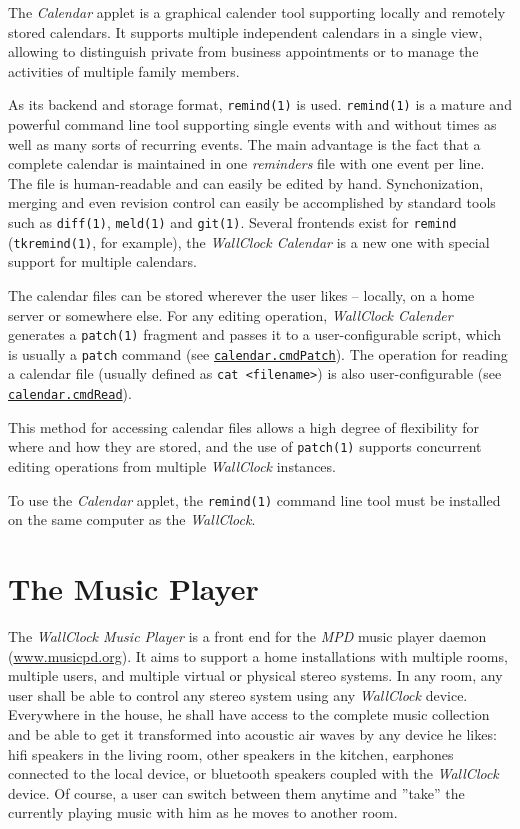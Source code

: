\documentclass[12pt,english,parskip=half]{scrreprt}
\newcommand{\idx}[1]{#1\index{#1}}
\newcommand{\envref}[1]{\hyperref[env:#1]{\texttt{#1}}}        %
\begin{document}
The \emph{Calendar} applet is a graphical calender tool supporting
locally and remotely stored calendars. It supports multiple independent
calendars in a single view, allowing to distinguish private from
business appointments or to manage the activities of multiple family
members.

As its backend and storage format, \texttt{remind(1)} is used.
\texttt{remind(1)} is a mature and powerful command line tool
supporting single events with and without times as well as
many sorts of recurring events. The main advantage is the fact that a
complete calendar is maintained in one \emph{reminders} file with one
event per line. The file is human-readable and can easily be
edited by hand. Synchonization, merging and even
revision control can easily be accomplished by standard tools such as
\texttt{diff(1)}, \texttt{meld(1)} and \texttt{git(1)}. 
Several frontends exist for \texttt{remind} (\texttt{tkremind(1)}, for example),
the \emph{WallClock Calendar} is a new one with special support for multiple
calendars.

The calendar files can be stored wherever the user likes -- locally, on
a home server or somewhere else. 
For any editing operation, \emph{WallClock Calender} generates a
\texttt{patch(1)} fragment and passes it to a user-configurable script, which
is usually a \texttt{patch} command (see \envref{calendar.cmdPatch}).
The operation for reading a calendar file (usually defined as \texttt{cat <filename>}) 
is also user-configurable (see \envref{calendar.cmdRead}).

This method for accessing calendar files allows a high degree of flexibility 
for where and how they are stored, and the use of \texttt{patch(1)} supports
concurrent editing operations from multiple \emph{WallClock} instances.

To use the \emph{Calendar} applet, the \texttt{remind(1)} command
line tool must be installed on the same computer as the \emph{WallClock}.





\section{The Music Player}
\label{sec:wallclock-music}


The \emph{WallClock Music Player} is a front end for the
\emph{MPD} music player daemon (\url{www.musicpd.org}). It aims to support a home
installations with multiple rooms, multiple users, and multiple virtual or physical
stereo systems. In any room, any user shall be able to control any
stereo system using any \emph{WallClock} device. Everywhere in the house,
he shall have access to the complete music collection and be able to
get it transformed into acoustic air waves by any device he likes:
hifi speakers in the living room, other speakers in the kitchen,
earphones connected to the local device, or bluetooth speakers
coupled with the \emph{WallClock} device. Of course, a user can switch
between them anytime and ''take'' the currently playing music with him as 
he moves to another room.
\end{document}
